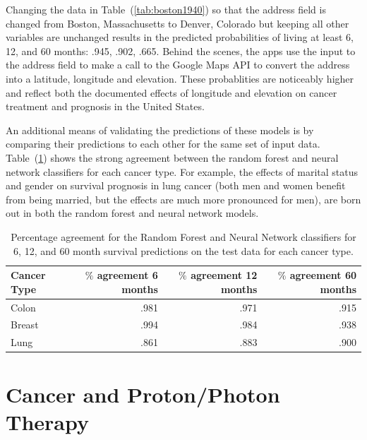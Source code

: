 \documentclass[a4paper,11pt]{article}
\begin{document}
Changing the data in Table~(\ref{tab:boston1940}) so that the address field is changed from Boston, Massachusetts to Denver, Colorado but keeping all other variables are unchanged results in the predicted probabilities of living at least 6, 12, and 60 months: .945, .902, .665. 
Behind the scenes, the apps use the input to the address field to make a call to the Google Maps API to convert the address into a latitude, longitude and elevation.
These probablities are noticeably higher and reflect both the documented effects of longitude and elevation on cancer treatment and prognosis in the United States.

An additional means of validating the predictions of these models is by comparing their predictions to each other for the same set of input data. 
Table~(\ref{tab:agree}) shows the strong agreement between the random forest and neural network classifiers for each cancer type. 
For example, the effects of marital status and gender on survival prognosis in lung cancer (both men and women benefit from being married, but the effects are much more pronounced for men), are born out in both the random forest and neural network models. 




\begin{table}[tbp]
\begin{center}
\begin{tabular}{lrrr}
\toprule
Cancer Type & $\%$ agreement 6 months & $\%$ agreement 12 months & $\%$ agreement 60 months \\ 
\midrule
Colon & .981 & .971 & .915 \\  
Breast & .994 & .984 & .938 \\  
Lung & .861 & .883 & .900 \\  
\bottomrule
\end{tabular}
\caption{\label{tab:agree} Percentage agreement for the Random Forest and Neural Network classifiers for 6, 12, and 60 month survival predictions on the test data for each cancer type.}
\end{center}
\end{table}





\section{Cancer and Proton/Photon Therapy}
\end{document}
